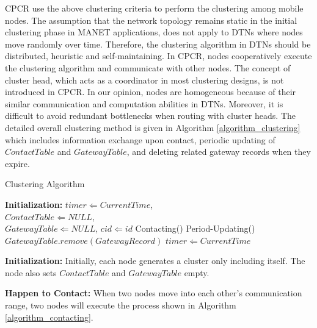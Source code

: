 \documentclass[conference]{IEEEtran}
\begin{document}
CPCR use the above clustering criteria to perform the clustering among mobile nodes.  The assumption that the network topology remains static in the initial clustering phase in MANET applications, does not apply to DTNs where nodes move randomly over time.
Therefore, the clustering algorithm in DTNs should be distributed, heuristic and self-maintaining. In CPCR, nodes cooperatively execute the clustering algorithm and communicate with other nodes. The concept of cluster head, which acts as a coordinator in most clustering designs, is not introduced in CPCR. In our opinion, nodes are homogeneous because of their similar communication and computation abilities in DTNs. Moreover, it is difficult to avoid redundant bottlenecks when routing with cluster heads.
The detailed overall clustering method is given in Algorithm \ref{algorithm_clustering} which includes information exchange upon contact, periodic updating of $ContactTable$ and $GatewayTable$, and deleting related gateway records when they expire.

\begin{algorithm}[!t]
\caption{Clustering Algorithm}\label{algorithm_clustering}
\begin{algorithmic}
\STATE \textbf{Initialization:} $timer \Leftarrow CurrentTime$,\\
$ContactTable \Leftarrow NULL$, \\$GatewayTable \Leftarrow  NULL$, $cid \Leftarrow id$
        \STATE Contacting()
        \STATE Period-Updating()
                \STATE $GatewayTable.remove(GatewayRecord)$
            \ENDIF
        \ENDFOR
        \STATE $timer \Leftarrow CurrentTime $
    \ENDIF
\ENDWHILE
\end{algorithmic}
\end{algorithm}

\smallskip
\textbf{Initialization:} Initially, each node generates a cluster only including itself. The node also sets $ContactTable$ and $GatewayTable$ empty.

\smallskip
\textbf{Happen to Contact:} When two nodes move into each other's communication range, two nodes will execute the process shown in Algorithm \ref{algorithm_contacting}.
\end{document}
